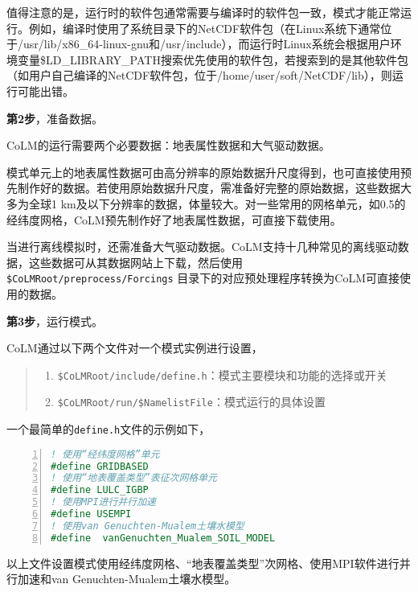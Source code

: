 值得注意的是，运行时的软件包通常需要与编译时的软件包一致，模式才能正常运行。例如，编译时使用了系统目录下的NetCDF软件包（在Linux系统下通常位于/usr/lib/x86\_64-linux-gnu和/usr/include），而运行时Linux系统会根据用户环境变量\$LD\_LIBRARY\_PATH搜索优先使用的软件包，若搜索到的是其他软件包（如用户自己编译的NetCDF软件包，位于/home/user/soft/NetCDF/lib），则运行可能出错。

\bigskip
\textbf{第2步}，准备数据。

CoLM的运行需要两个必要数据：地表属性数据和大气驱动数据。

模式单元上的地表属性数据可由高分辨率的原始数据升尺度得到，也可直接使用预先制作好的数据。若使用原始数据升尺度，需准备好完整的原始数据，这些数据大多为全球1 km及以下分辨率的数据，体量较大。对一些常用的网格单元，如0.5\textdegree 的经纬度网格，CoLM预先制作好了地表属性数据，可直接下载使用。

当进行离线模拟时，还需准备大气驱动数据。CoLM支持十几种常见的离线驱动数据，这些数据可从其数据网站上下载，然后使用 \texttt{\$CoLMRoot/preprocess/Forcings} 目录下的对应预处理程序转换为CoLM可直接使用的数据。

\bigskip
\textbf{第3步}，运行模式。

CoLM通过以下两个文件对一个模式实例进行设置，
\begin{quote}
\begin{enumerate}[label=\arabic*)]
    \item \texttt{\$CoLMRoot/include/define.h}：模式主要模块和功能的选择或开关
    \item \texttt{\$CoLMRoot/run/\$NamelistFile}：模式运行的具体设置
\end{enumerate}
\end{quote}

一个最简单的\texttt{define.h}文件的示例如下，
\begin{lstlisting}[language=fortran, basicstyle=\linespread{1.2}\footnotesize\ttfamily, commentstyle=\color{black}, numbers=left, numberstyle=\tiny, xleftmargin=1.5em,xrightmargin=0em, aboveskip=1em]
! 使用“经纬度网格”单元
#define GRIDBASED
! 使用“地表覆盖类型”表征次网格单元
#define LULC_IGBP
! 使用MPI进行并行加速
#define USEMPI
! 使用van Genuchten-Mualem土壤水模型
#define  vanGenuchten_Mualem_SOIL_MODEL
\end{lstlisting}

以上文件设置模式使用经纬度网格、“地表覆盖类型”次网格、使用MPI软件进行并行加速和van Genuchten-Mualem土壤水模型。

